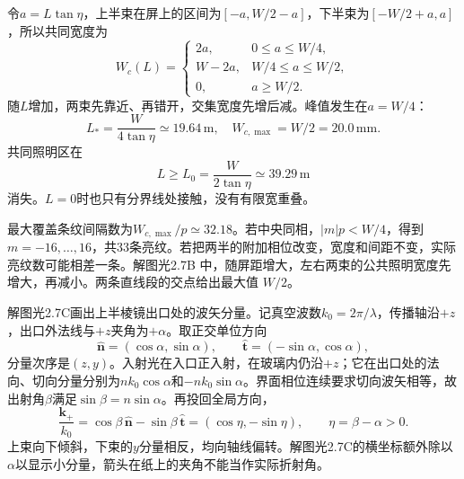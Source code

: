 \documentclass[UTF8,fontset=fandol,a4paper,11pt]{ctexart}
\newcommand{\figcaption}[1]{\par\vspace{2pt}{\small\color{muted}#1}\par}
\begin{document}
令$a=L\tan\eta$，上半束在屏上的区间为$[-a,W/2-a]$，下半束为$[-W/2+a,a]$，所以共同宽度为
\[
W_c(L)=
\begin{cases}
2a,&0\le a\le W/4,\\
W-2a,&W/4\le a\le W/2,\\
0,&a\ge W/2.
\end{cases}
\]
随$L$增加，两束先靠近、再错开，交集宽度先增后减。峰值发生在$a=W/4$：
\[
\boxed{L_*=\frac{W}{4\tan\eta}\simeq19.64\,\mathrm m,\quad
W_{c,\max}=W/2=20.0\,\mathrm{mm}.}
\]
共同照明区在
\[
\boxed{L\ge L_0=\frac{W}{2\tan\eta}\simeq39.29\,\mathrm m}
\]
消失。$L=0$时也只有分界线处接触，没有有限宽重叠。

最大覆盖条纹间隔数为$W_{c,\max}/p\simeq32.18$。若中央同相，$|m|p<W/4$，得到$m=-16,\ldots,16$，共33条亮纹。若把两半的附加相位改变，宽度和间距不变，实际亮纹数可能相差一条。解图光2.7B 中，随屏距增大，左右两束的公共照明宽度先增大，再减小。两条直线段的交点给出最大值 $W/2$。
\begin{center}\begin{minipage}{.98\linewidth}\centering
{}
\figcaption{解图光2.7B\quad 宽度分段函数和最佳屏上的区间}
\end{minipage}\end{center}

解图光2.7C画出上半棱镜出口处的波矢分量。记真空波数$k_0=2\pi/\lambda$，传播轴沿$+z$，出口外法线与$+z$夹角为$+\alpha$。取正交单位方向
\[
\widehat{\boldsymbol n}=(\cos\alpha,\sin\alpha),\qquad
\widehat{\boldsymbol t}=(-\sin\alpha,\cos\alpha),
\]
分量次序是$(z,y)$。入射光在入口正入射，在玻璃内仍沿$+z$；它在出口处的法向、切向分量分别为$nk_0\cos\alpha$和$-nk_0\sin\alpha$。界面相位连续要求切向波矢相等，故出射角$\beta$满足$\sin\beta=n\sin\alpha$。再投回全局方向，
\[
\frac{\boldsymbol k_+}{k_0}
=\cos\beta\,\widehat{\boldsymbol n}-\sin\beta\,\widehat{\boldsymbol t}
=(\cos\eta,-\sin\eta),\qquad\eta=\beta-\alpha>0.
\]
上束向下倾斜，下束的$y$分量相反，均向轴线偏转。解图光2.7C的横坐标额外除以$\alpha$以显示小分量，箭头在纸上的夹角不能当作实际折射角。
\end{document}
